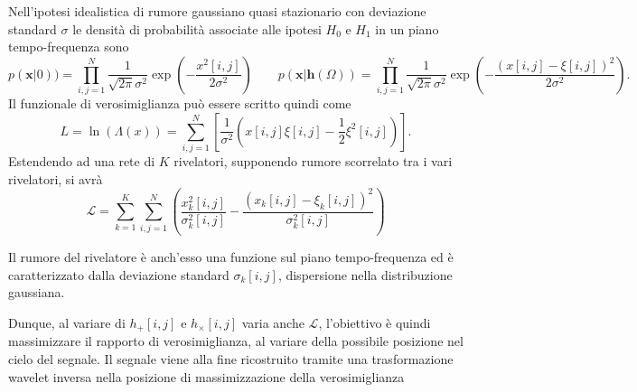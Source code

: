Nell'ipotesi idealistica di rumore gaussiano quasi stazionario con deviazione standard $\sigma$ le densità di probabilità associate alle ipotesi $H_0$ e $H_1$ in un piano tempo-frequenza sono 
\begin{equation}
	p(\mathbf{x}|0)) = \prod_{i,j=1}^N\frac{1}{\sqrt{2\pi}\sigma^2}\exp(-\frac{x^2[i,j]}{2\sigma^2})
	\quad\quad
	p(\mathbf{x}|\mathbf{h}(\Omega)) = \prod_{i,j=1}^N\frac{1}{\sqrt{2\pi}\sigma^2}\exp(-\frac{(x[i,j]-\xi[i,j])^2}{2\sigma^2}).
\end{equation}
Il funzionale di verosimiglianza può essere scritto quindi come
\begin{equation}
	L = \ln(\Lambda(x)) = \sum_{i,j=1}^{N}\left[\frac{1}{\sigma^2}\left(x[i,j]\xi[i,j]-\frac{1}{2}\xi^2[i,j]\right)\right].
\end{equation}
Estendendo ad una rete di $K$ rivelatori, supponendo rumore scorrelato tra i vari rivelatori, si avrà
\begin{equation}
	\mathcal{L} = \sum_{k=1}^{K}\sum_{i,j=1}^{N}\left(\frac{x_k^2[i,j]}{\sigma_k^2[i,j]} - \frac{(x_k[i,j]-\xi_k[i,j])^2}{\sigma_k^2[i,j]}  \right)
	\label{eqn:Likelihood}
\end{equation}

Il rumore del rivelatore è anch'esso una funzione sul piano tempo-frequenza ed è caratterizzato dalla deviazione standard $\sigma_k[i,j]$, dispersione nella distribuzione gaussiana.

Dunque, al variare di $h_{+}[i,j]$ e $h_{\times}[i,j]$ varia anche $\mathcal{L}$, l'obiettivo è quindi massimizzare il rapporto di verosimiglianza, al variare della possibile posizione nel cielo del segnale. Il segnale viene alla fine ricostruito tramite una trasformazione wavelet inversa nella posizione di massimizzazione della verosimiglianza

